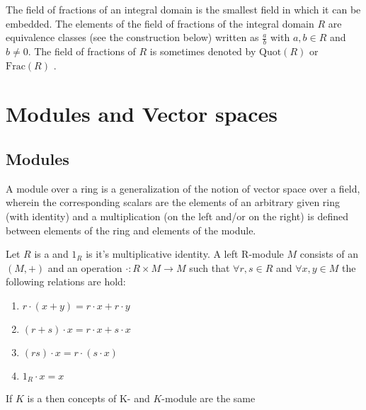 \begin{appendices}
\begin{definition}
  The field of fractions of an integral domain is the smallest field
  in which it can be embedded. The elements of the field of fractions
  of the integral domain $R$ are equivalence classes
  (see the construction below) written as $\frac{a}{b}$ with $a, b \in
  R$ and $b\neq 0$. The field of
  fractions of $R$ is sometimes denoted by
  $\mathrm{Quot} (R)$ or $\mathrm {Frac}(R)$ \cite{wiki:fractionfield}. 
  \label{def:fractionfield}
\end{definition}

\section{Modules and Vector spaces}

\subsection{Modules}

A module over a ring is a generalization of the notion of vector space
over a field, wherein the corresponding scalars are the elements of an
arbitrary given ring (with identity) and a multiplication (on the left
and/or on the right) is defined between elements of the ring and
elements of the module.

\begin{definition}[Module]
  Let $R$ is a  and $1_R$ is it's multiplicative
  identity. A left R-module $M$ consists of an 
  $\left(M, +\right)$ and an operation $\cdot: R \times M \to M$ such
  that $\forall r,s \in R$ and $\forall x,y \in M$ the following
  relations are hold:
  \begin{enumerate}
  \item $r \cdot \left(x+y\right) = r \cdot x + r \cdot y$
  \item $\left(r + s \right) \cdot x = r \cdot x + s \cdot x$
  \item $\left(rs\right) \cdot x = r \cdot \left(s \cdot x\right)$
  \item $1_R \cdot x = x$
  \end{enumerate}
  \label{def:module}
\end{definition}

\begin{example}[Module]
  If $K$ is a  then concepts of
  K- and $K$-module are the same
\end{example}


\end{appendices}

